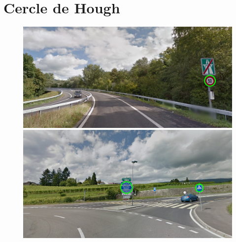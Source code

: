 \documentclass[a4paper,10pt,openany,oneside]{report}
\begin{document}
\section{Cercle de Hough}
\begin{figure}[!h]
\centering
\includegraphics[width=\textwidth]{../img/19-hough_circles.png}
\includegraphics[width=\textwidth]{../img/39-hough_circles.png}
\end{figure}
\pagebreak
\end{document}
